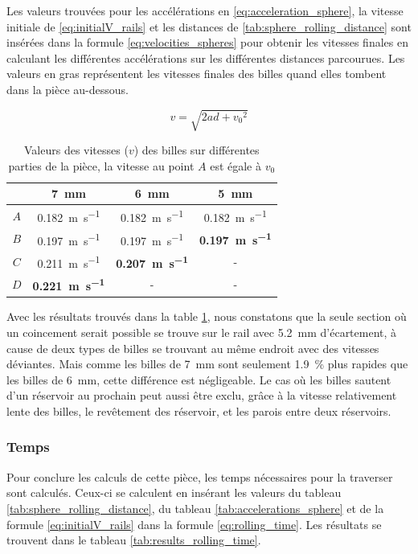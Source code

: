 Les valeurs trouvées pour les accélérations en \ref{eq:acceleration_sphere}, la vitesse initiale de \ref{eq:initialV_rails} et les distances de \ref{tab:sphere_rolling_distance} sont insérées dans la formule \ref{eq:velocities_spheres} pour obtenir les vitesses finales en calculant les différentes accélérations sur les différentes distances parcourues. Les valeurs en gras représentent les vitesses finales des billes quand elles tombent dans la pièce au-dessous.

\begin{equation}
    v=\sqrt{2ad +{v_{0}}^{2}}
    \label{eq:velocities_spheres}
\end{equation}

\begin{table}[htbp]
    \centering
    \begin{tabular}{|c|c|c|c|}
        \hline
         & \SI{7}{\mm} & \SI{6}{\mm} & \SI{5}{\mm} \\
        \hline
        $A$ & \SI{0.182}{\m\per\s} & \SI{0.182}{\m\per\s} & \SI{0.182}{\m\per\s} \\
        \hline
        $B$ & \SI{0.197}{\m\per\s} & \SI{0.197}{\m\per\s} & \textbf{\SI{0.197}{\m\per\s}} \\
        \hline
        $C$ & \SI{0.211}{\m\per\s} & \textbf{\SI{0.207}{\m\per\s}} & - \\
        \hline
        $D$ & \textbf{\SI{0.221}{\m\per\s}} & - & - \\
        \hline
    \end{tabular}
    \caption{Valeurs des vitesses ($v$) des billes sur différentes parties de la pièce, la vitesse au point $A$ est égale à $v_{0}$}
    \label{tab:sphere_velocities}
\end{table}

Avec les résultats trouvés dans la table \ref{tab:sphere_velocities}, nous constatons que la seule section où un coincement serait possible se trouve sur le rail avec \SI{5.2}{\mm} d'écartement, à cause de deux types de billes se trouvant au même endroit avec des vitesses déviantes. Mais comme les billes de \SI{7}{\mm} sont seulement \SI{1.9}{\percent} plus rapides que les billes de \SI{6}{\mm}, cette différence est négligeable. Le cas où les billes sautent d'un réservoir au prochain peut aussi être exclu, grâce à la vitesse relativement lente des billes, le revêtement des réservoir, et les parois entre deux réservoirs.

\subsubsection{Temps}
Pour conclure les calculs de cette pièce, les temps nécessaires pour la traverser sont calculés. Ceux-ci se calculent en insérant les valeurs du tableau \ref{tab:sphere_rolling_distance}, du tableau \ref{tab:accelerations_sphere} et de la formule \ref{eq:initialV_rails} dans la formule \ref{eq:rolling_time}. Les résultats se trouvent dans le tableau \ref{tab:results_rolling_time}.

